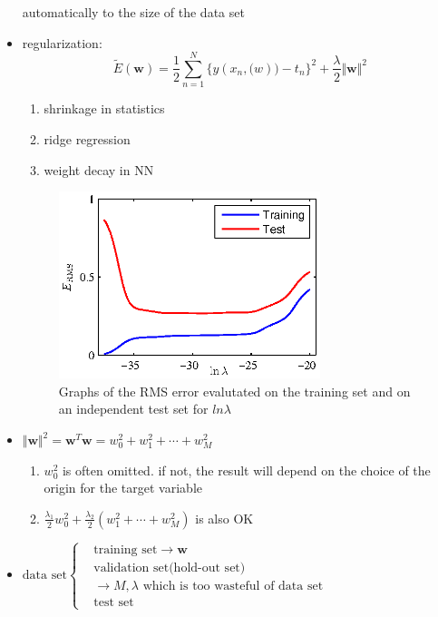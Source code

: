 \documentclass[12pt, a4paper]{article}
\begin{document}
\begin{itemize}
        automatically to the size of the data set
        \item regularization:
        \[
            \widetilde{E}(\bm{w})=\frac{1}{2}\sum_{n=1}^N\{y(x_n,\bm(w))
            -t_n\}^2+\frac{\lambda}{2}\Vert\bm{w}\Vert^2
            \]
        \begin{enumerate}
            \item shrinkage in statistics
            \item ridge regression
            \item weight decay in NN
        \end{enumerate}
        \begin{figure}[ht]
            \begin{center}
                \includegraphics[width=3in]{figures/Figure1_8.eps}
                \caption{Graphs of the RMS error evalutated on the training 
                set and on an independent test set for $ln\lambda$}
            \end{center}
        \end{figure}
        \item $\Vert\bm{w}\Vert^2=\bm{w}^T\bm{w}=w_0^2+w_1^2+\cdots+w_M^2$
        \begin{enumerate}
            \item $w_0^2$ is often omitted. if not, the result will depend
            on the choice of the origin for the target variable
            \item $\frac{\lambda_1}{2}w_0^2+\frac{\lambda_2}{2}(w_1^2+
            \cdots+w_M^2)$ is also OK 
        \end{enumerate}
        \item $\text{data set}\begin{cases}
            &\text{training set}\rightarrow\bm{w}\\
            &\text{validation set(hold-out set)}\\
            &\rightarrow M,\lambda
            \text{ which is too wasteful of data set}\\
            &\text{test set}
            \end{cases}$
    \end{itemize}
\end{document}
